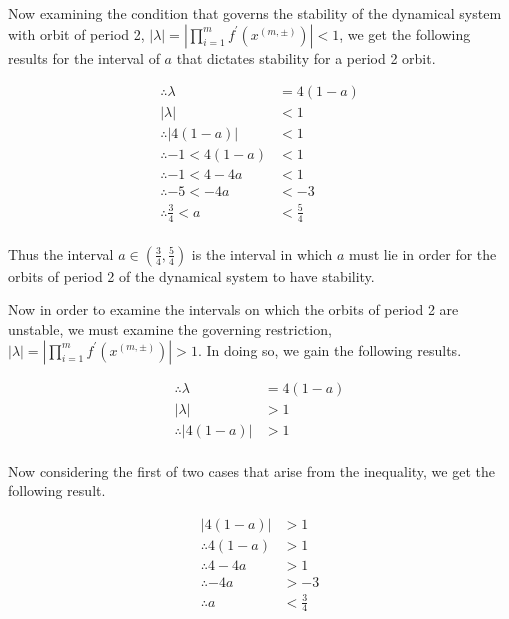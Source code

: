 \documentclass[a4paper]{article}
\begin{document}
\begin{enumerate}[label=\textbf{\arabic*.}]
\begin{enumerate}
		Now examining the condition that governs the stability of the dynamical system with orbit of period 2, $\displaystyle{|\lambda| = \left|\prod_{i=1}^{m}f^\prime (x^{(m,\pm)})\right| < 1}$, we get the following results for the interval of $a$ that dictates stability for a period 2 orbit.

		\begin{align*}
		\therefore \lambda & = 4(1-a)\\
		\left|\lambda \right| & < 1\\
		\therefore \left|4(1-a) \right| & < 1\\
		\therefore -1 < 4(1-a) & < 1\\
		\therefore -1 < 4 - 4a & < 1\\
		\therefore -5 < -4a & < -3\\
		\therefore \frac{3}{4} < a & < \frac{5}{4}\\
		\end{align*}

		Thus the interval $\displaystyle{a \in \left(\frac{3}{4}, \frac{5}{4} \right)}$ is the interval in which $a$ must lie in order for the orbits of period 2 of the dynamical system to have stability. 

		\bigbreak

		Now in order to examine the intervals on which the orbits of period 2 are unstable, we must examine the governing restriction, $\displaystyle{|\lambda| = \left|\prod_{i=1}^{m}f^\prime (x^{(m,\pm)})\right| > 1}$. In doing so, we gain the following results.

		\begin{align*}
		\therefore \lambda & = 4(1-a)\\
		\left|\lambda \right| & > 1\\
		\therefore \left|4(1-a) \right| & > 1\\
		\end{align*}

		Now considering the first of two cases that arise from the inequality, we get the following result.

		\begin{align*}
		\left|4(1-a) \right| & > 1\\
		\therefore 4(1-a) & > 1\\
		\therefore 4 - 4a & > 1\\
		\therefore -4a & > -3\\
		\therefore a & < \frac{3}{4}\\
		\end{align*}


\end{enumerate}
\end{enumerate}
\end{document}
